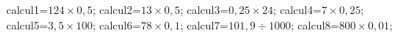 \documentclass[exercice]{thedocument}%
\begin{document}
%
\>calcul1=$124\times0,5$;%
\>calcul2=$13\times0,5$;%
\>calcul3=$0,25\times24$;%
\>calcul4=$7\times0,25$;%
\>calcul5=$3,5\times100$;%
\>calcul6=$78\times0,1$;%
\>calcul7=$101,9\div1000$;%
\>calcul8=$800\times0,01$;%
%
\end{document}
